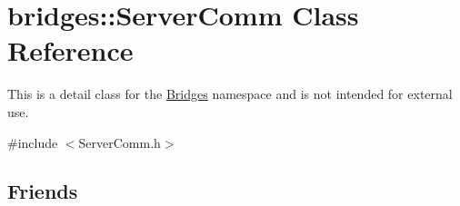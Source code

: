\hypertarget{classbridges_1_1_server_comm}{}\section{bridges\+:\+:Server\+Comm Class Reference}
\label{classbridges_1_1_server_comm}


This is a detail class for the \mbox{\hyperlink{namespacebridges_1_1_bridges}{Bridges}} namespace and is not intended for external use.  




{\ttfamily \#include $<$Server\+Comm.\+h$>$}

\subsection*{Friends}
